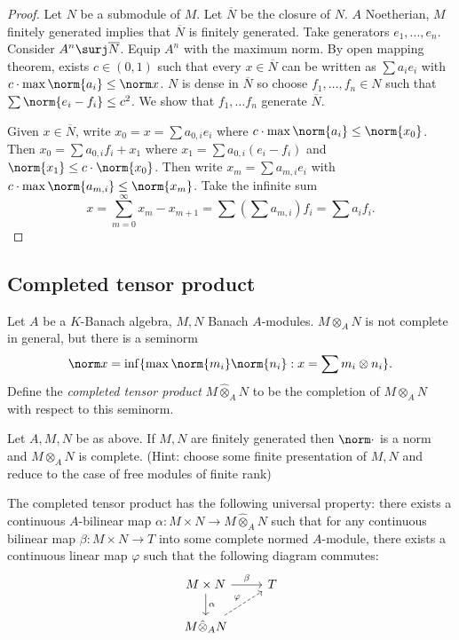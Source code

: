 \documentclass[a4paper]{article}
\begin{document}
\begin{proof}
  Let \(N\) be a submodule of \(M\). Let \(\overline N\) be the closure of \(N\). \(A\) Noetherian, \(M\) finitely generated implies that \(\overline N\) is finitely generated. Take generators \(e_1, \dots, e_n\). Consider \(A^n \surj \overline N\). Equip \(A^n\) with the maximum norm. By open mapping theorem, exists \(c \in (0, 1)\) such that every \(x \in \overline N\) can be written as \(\sum a_i e_i\) with \(c \cdot \max \norm{a_i} \leq \norm x\). \(N\) is dense in \(\overline N\) so choose \(f_1, \dots, f_n \in N\) such that \(\sum \norm{e_i - f_i} \leq c^2\). We show that \(f_1, \dots f_n\) generate \(\overline N\).

  Given \(x \in \overline N\), write \(x_0 = x = \sum a_{0, i} e_i\) where \(c \cdot \max \norm{a_i} \leq \norm{x_0}\). Then \(x_0 = \sum a_{0, i} f_i + x_1\) where \(x_1 = \sum a_{0, i}(e_i - f_i)\) and \(\norm {x_1} \leq c \cdot \norm{x_0}\). Then write \(x_m = \sum a_{m, i} e_i\) with \(c \cdot \max \norm{a_{m, i}} \leq \norm{x_m}\). Take the infinite sum
  \[
    x = \sum_{m = 0}^\infty x_m - x_{m + 1} = \sum (\sum a_{m, i})f_i = \sum a_i f_i.
  \]
\end{proof}

\subsection{Completed tensor product}

Let \(A\) be a \(K\)-Banach algebra, \(M, N\) Banach \(A\)-modules. \(M \otimes_A N\) is not complete in general, but there is a seminorm
\[
  \norm x = \inf\{\max \norm{m_i} \norm{n_i}: x = \sum m_i \otimes n_i\}.
\]
Define the \emph{completed tensor product} \(M \hat \otimes_A N\) to be the completion of \(M \otimes_A N\) with respect to this seminorm.

\begin{ex}
  Let \(A, M, N\) be as above. If \(M, N\) are finitely generated then \(\norm \cdot\) is a norm and \(M \otimes_A N\) is complete. (Hint: choose some finite presentation of \(M, N\) and reduce to the case of free modules of finite rank)
\end{ex}

The completed tensor product has the following universal property: there exists a continuous \(A\)-bilinear map \(\alpha: M \times N \to M \hat \otimes_A N\) such that for any continuous bilinear map \(\beta: M \times N \to T\) into some complete normed \(A\)-module, there exists a continuous linear map \(\varphi\) such that the following diagram commutes:
\[
  \begin{tikzcd}
    M \times N \ar[d, "\alpha"] \ar[r, "\beta"] & T \\
    M \hat \otimes_A N \ar[ur, "\varphi", dashed]
  \end{tikzcd}
\]
\end{document}
